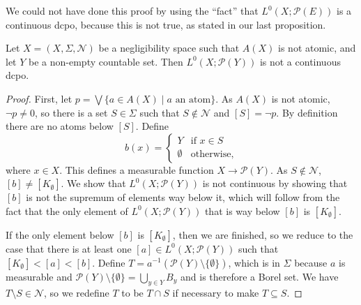 \documentclass{lmcs}
\newcommand{\En}{\mathcal{N}}
\newcommand{\powerset}{\ensuremath{\mathcal{P}}}
\begin{document}
We could not have done this proof by using the ``fact'' that $L^0(X;\powerset(E))$ is a continuous dcpo, because this is not true, as stated in our last proposition. 

\begin{prop}
\label{NotContinuousProp}
Let $X = (X,\Sigma,\En)$ be a negligibility space such that $A(X)$ is not atomic, and let $Y$ be a non-empty countable set. Then $L^0(X;\powerset(Y))$ is not a continuous dcpo. 
\end{prop}
\begin{proof}
First, let $p = \bigvee \{ a \in A(X) \mid a \text{ an atom} \}$. As $A(X)$ is not atomic, $\lnot p \neq 0$, so there is a set $S \in \Sigma$ such that $S \not\in \En$ and $[S] = \lnot p$. By definition there are no atoms below $[S]$. Define
\[
b(x) = \begin{cases} Y & \text{if } x \in S \\
\emptyset & \text{otherwise,} \end{cases}
\]
where $x \in X$. This defines a measurable function $X \rightarrow \powerset(Y)$. As $S \not\in \En$, $[b] \neq [K_\emptyset]$. We show that $L^0(X;\powerset(Y))$ is not continuous by showing that $[b]$ is not the supremum of elements way below it, which will follow from the fact that the only element of $L^0(X;\powerset(Y))$ that is way below $[b]$ is $[K_\emptyset]$. 
	
If the only element below $[b]$ is $[K_\emptyset]$, then we are finished, so we reduce to the case that there is at least one $[a] \in L^0(X;\powerset(Y))$ such that $[K_\emptyset] < [a] < [b]$. Define $T = a^{-1}(\powerset(Y) \setminus \{\emptyset\})$, which is in $\Sigma$ because $a$ is measurable and $\powerset(Y) \setminus \{\emptyset\} = \bigcup_{y \in Y} B_y$ and is therefore a Borel set. We have $T \setminus S \in \En$, so we redefine $T$ to be $T \cap S$ if necessary to make $T \subseteq S$. 
	

\end{proof}
\end{document}

